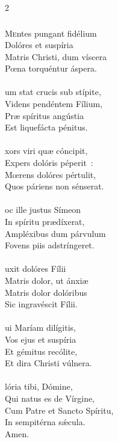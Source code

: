 \documentclass[9pt,twoside]{extarticle}
\begin{document}
\begin{multicols}{2}
\subsubsection*{\center {}}
\lettrine{M}entes pungant fidélium\\
Dolóres et suspíria\\
Matris Christi, dum víscera\\
Pœna torquéntur áspera.\\
\\
um stat crucis sub stípite,\\
Videns pendéntem Fílium,\\
Præ spíritus angústia\\
Est liquefácta pénitus.\\
\\
xors viri quæ cóncipit,\\
Expers dolóris péperit~:\\
Mœrens dolóres pértulit,\\
Quos páriens non sénserat.\\
\\
oc ille justus Símeon\\
In spíritu prædíxerat,\\
Ampléxibus dum párvulum\\
Fovens piis adstríngeret.\\
\\
uxit dolóres Fílii\\
Matris dolor, ut ánxiæ\\
Matris dolor dolóribus\\
Sic ingravéscit Fílii.\\
\\
ui Maríam dilígitis,\\
Vos ejus et suspíria\\
Et gémitus recólite,\\
Et dira Christi vúlnera.\\
\\
lória tibi, Dómine,\\
Qui natus es de Vírgine,\\
Cum Patre et Sancto Spíritu,\\
In sempitérna sǽcula.\\
Amen.


\end{multicols}
\end{document}
